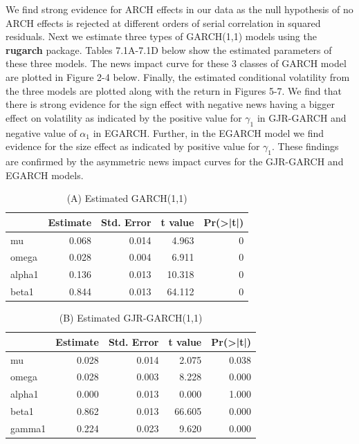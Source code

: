\documentclass[]{book}
\theoremstyle{definition}
\theoremstyle{definition}
\theoremstyle{definition}
\theoremstyle{remark}
\begin{document}
We find strong evidence for ARCH effects in our data as the null hypothesis of no ARCH effects is rejected at different orders of serial correlation in squared residuals. Next we estimate three types of GARCH(1,1) models using the \textbf{rugarch} package. Tables 7.1A-7.1D below show the estimated parameters of these three models. The news impact curve for these 3 classes of GARCH model are plotted in Figure 2-4 below. Finally, the estimated conditional volatility from the three models are plotted along with the return in Figures 5-7. We find that there is strong evidence for the sign effect with negative news having a bigger effect on volatility as indicated by the positive value for \(\gamma_1\) in GJR-GARCH and negative value of \(\alpha_1\) in EGARCH. Further, in the EGARCH model we find evidence for the size effect as indicated by positive value for \(\gamma_1\). These findings are confirmed by the asymmetric news impact curves for the GJR-GARCH and EGARCH models.

\begin{table}[t]

\caption{\label{tab:unnamed-chunk-11}(A) Estimated GARCH(1,1)}
\centering
\begin{tabular}{l|r|r|r|r}
\hline
  &  Estimate &  Std. Error &  t value & Pr(>|t|)\\
\hline
mu & 0.068 & 0.014 & 4.963 & 0\\
\hline
omega & 0.028 & 0.004 & 6.911 & 0\\
\hline
alpha1 & 0.136 & 0.013 & 10.318 & 0\\
\hline
beta1 & 0.844 & 0.013 & 64.112 & 0\\
\hline
\end{tabular}
\end{table}

\begin{table}[t]

\caption{\label{tab:unnamed-chunk-11}(B) Estimated GJR-GARCH(1,1)}
\centering
\begin{tabular}{l|r|r|r|r}
\hline
  &  Estimate &  Std. Error &  t value & Pr(>|t|)\\
\hline
mu & 0.028 & 0.014 & 2.075 & 0.038\\
\hline
omega & 0.028 & 0.003 & 8.228 & 0.000\\
\hline
alpha1 & 0.000 & 0.013 & 0.000 & 1.000\\
\hline
beta1 & 0.862 & 0.013 & 66.605 & 0.000\\
\hline
gamma1 & 0.224 & 0.023 & 9.620 & 0.000\\
\hline
\end{tabular}
\end{table}
\end{document}
